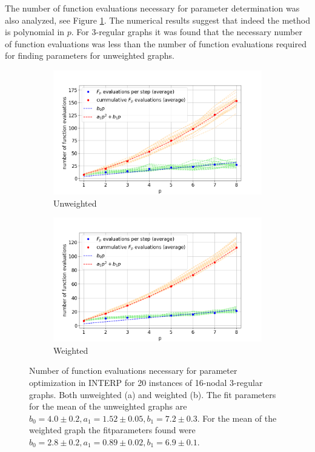 The number of function evaluations necessary for parameter determination was also analyzed, see Figure \ref{fig:n_evals-3-regular}. The numerical results suggest that indeed the method is polynomial in $p$. For 3-regular graphs it was found that the necessary number of function evaluations was less than the number of function evaluations required for finding parameters for unweighted graphs.
\begin{figure}[H]
	\begin{subfigure}[t]{0.5\textwidth}
		\centering
		\includegraphics[width=\textwidth]{figures/interp/function_evaluations_16-nodal_unweighted.png}
		\captionsetup{justification=centering}
		\caption{Unweighted}
	\end{subfigure}
	\begin{subfigure}[t]{0.5\textwidth}
		\centering
		\includegraphics[width=\textwidth]{figures/interp/function_evaluations_16-nodal_weighted.png}
		\captionsetup{justification=centering}
		\caption{Weighted}
	\end{subfigure}
	\caption{Number of function evaluations necessary for parameter optimization in INTERP for 20 instances of 16-nodal 3-regular graphs. Both unweighted (a) and weighted (b). The fit parameters for the mean of the unweighted graphs are $b_0 = 4.0 \pm 0.2, a_1 = 1.52 \pm 0.05, b_1 = 7.2 \pm 0.3$. For the mean of the weighted graph the fitparameters found were $b_0 = 2.8 \pm 0.2, a_1 = 0.89 \pm 0.02, b_1 = 6.9 \pm 0.1$.}	
	\label{fig:n_evals-3-regular}
\end{figure}


